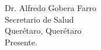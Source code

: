 \documentclass[final,10pt]{letter}
\begin{document}
\begin{letter}{%
Dr. Alfredo Gobera Farro \\
Secretario de Salud \\
Querétaro, Querétaro \\
Presente.
}


\end{letter}
\end{document}
